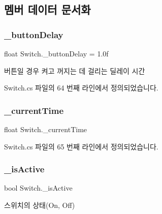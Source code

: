 \subsection{멤버 데이터 문서화}
\mbox{\label{class_switch_aa48b86d0289cb6ec86a63798760739ba}} 
\subsubsection{\texorpdfstring{\_buttonDelay}{\_buttonDelay}}
{\footnotesize\ttfamily float Switch.\+\_\+button\+Delay = 1.\+0f\hspace{0.3cm}{\ttfamily [private]}}



버튼일 경우 켜고 꺼지는 데 걸리는 딜레이 시간 



Switch.\+cs 파일의 64 번째 라인에서 정의되었습니다.

\mbox{\label{class_switch_a24a92f60741278f45ea7d4ba0b5e1ce7}} 
\subsubsection{\texorpdfstring{\_currentTime}{\_currentTime}}
{\footnotesize\ttfamily float Switch.\+\_\+current\+Time\hspace{0.3cm}{\ttfamily [private]}}



Switch.\+cs 파일의 65 번째 라인에서 정의되었습니다.

\mbox{\label{class_switch_aba91cb75ae6b195cdbddf65ea843370a}} 
\subsubsection{\texorpdfstring{\_isActive}{\_isActive}}
{\footnotesize\ttfamily bool Switch.\+\_\+is\+Active\hspace{0.3cm}{\ttfamily [protected]}}



스위치의 상태(\+On, Off) 



